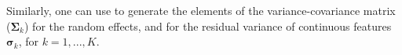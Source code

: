 Similarly, one can use  to generate the elements of the variance-covariance matrix ($\boldsymbol{\Sigma}_k$) for the random effects, and    for the residual variance of continuous features $\boldsymbol{\sigma}_k$, for $k=1,...,K$. 
